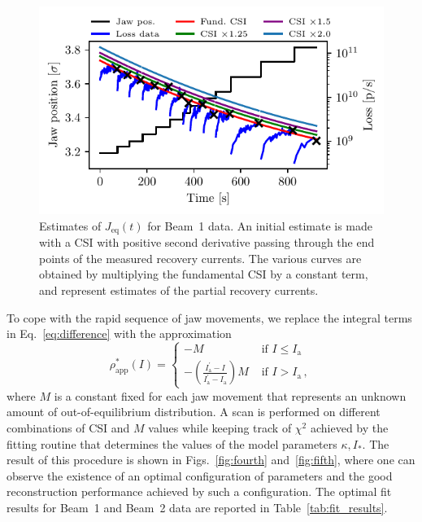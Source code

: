 %
\begin{figure}
    \centering
    \includegraphics[trim={0 2.5mm 0 3mm}, clip, width=\columnwidth]{5_Diffusion_measurement_LHC/figs/second_bis.pdf}
    \caption{Estimates of $J_\mathrm{eq}(t)$ for Beam~1 data. An initial estimate is made with a CSI with positive second derivative passing through the end points of the measured recovery currents. The various curves are obtained by multiplying the fundamental CSI by a constant term, and represent estimates of the partial recovery currents.}
    \label{fig:second}
\end{figure}
%

To cope with the rapid sequence of jaw movements, we replace the integral terms in Eq.~\eqref{eq:difference} with the approximation
\begin{equation}
    \rho_{\mathrm{app}}^{*}(I)= \begin{cases} -M & \text { if } I\leq I_{\mathrm{a}}\\ -\left(\frac{I_{\mathrm{a}}^{\prime }-I}{I_{\mathrm{a}}^{ \prime}-I_{\mathrm{a}}}\right) M & \text { if } I>I_{\mathrm{a}} \, , \end{cases} 
\end{equation}
where $M$ is a constant fixed for each jaw movement that represents an unknown amount of out-of-equilibrium distribution.
A scan is performed on different combinations of CSI and $M$ values while keeping track of $\chi^2$ achieved by the fitting routine that determines the values of the model parameters $\kappa, I_\ast$. The result of this procedure is shown in Figs.~\ref{fig:fourth} and~\ref{fig:fifth}, where one can observe the existence of an optimal configuration of parameters and the good reconstruction performance achieved by such a configuration. The optimal fit results for Beam~1 and Beam~2 data are reported in Table~\ref{tab:fit_results}.

